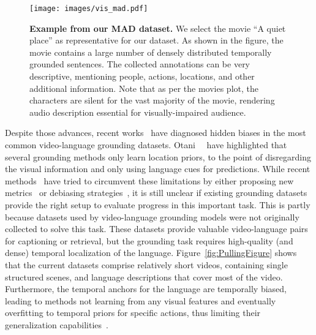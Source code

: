 \documentclass[10pt,twocolumn,letterpaper]{article}
\begin{document}
\begin{figure*}[!ht]
    \vspace{-0.2cm}
    \center
    \texttt{[image: images/vis\_mad.pdf]}
    \caption{\textbf{Example from our MAD dataset.} 
    We select the movie ``A quiet place'' as representative for our dataset. As shown in the figure, the movie contains a large number of densely distributed temporally grounded sentences.
    The collected annotations can be very descriptive, mentioning people, actions, locations, and other additional information. Note that as per the movies plot, the characters are silent for the vast majority of the movie, rendering audio description essential for visually-impaired audience.
    }
    \label{fig:mad-sample}
    \vspace{-0.4cm}
\end{figure*} 
Despite those advances, recent works~\cite{otani2020challengesmr, DBLP:journals/corr/abs-2101-09028,zhang2021towards} have diagnosed hidden biases in the most common video-language grounding datasets. 
Otani~\etal~\cite{otani2020challengesmr} have highlighted that several grounding methods only learn location priors, to the point of disregarding the visual information and only using language cues for predictions. 
While recent methods~\cite{DBLP:journals/corr/abs-2101-09028,zhang2021towards} have tried to circumvent these limitations by either proposing new metrics~\cite{yuan2021closer} or debiasing strategies~\cite{zhang2021towards,zhou2021embracing}, it is still unclear if existing grounding datasets~\cite{TACoS_ACL_2013,Krishna_2017_ICCV,Hendricks_2017_ICCV,Gao_2017_ICCV} provide the right setup to evaluate progress in this important task.
This is partly because datasets used by video-language grounding models were not originally collected to solve this task.
These datasets provide valuable video-language pairs for captioning or retrieval, but the grounding task requires high-quality (and dense) temporal localization of the language.
Figure~\ref{fig:PullingFigure} shows that the current datasets comprise relatively short videos, containing single structured scenes, and language descriptions that cover most of the video. 
Furthermore, the temporal anchors for the language are temporally biased, leading to methods not learning from any visual features and eventually overfitting to temporal priors for specific actions, thus limiting their generalization capabilities~\cite{otani2020challengesmr,lan2021survey}.
\end{document}
